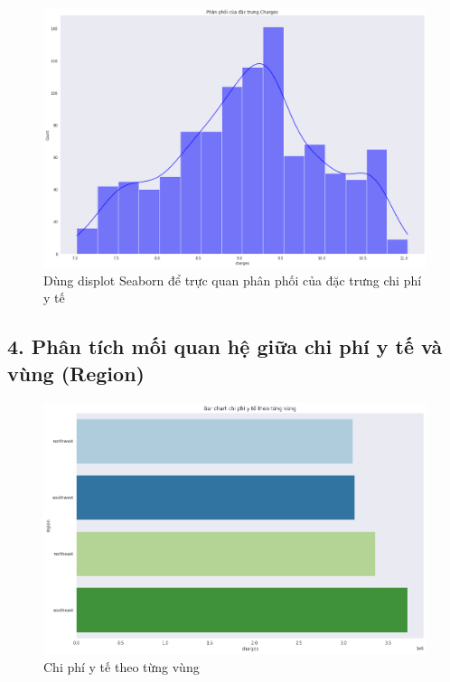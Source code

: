 \documentclass{article}
\begin{document}
	\begin{figure}[H]
		\centering
		\includegraphics[width=1\textwidth]{images/dist_medical_charges_plot_log_scale.png}
		\caption{Dùng displot Seaborn để trực quan phân phối của đặc trưng chi phí y tế}
		\label{fig:writing-thesis}
	\end{figure}
	
	\subsection{4. Phân tích mối quan hệ giữa chi phí y tế và vùng (Region)}
	\begin{figure}[H]
		\centering
		\includegraphics[width=1\textwidth]{images/bar_chart_medical_charges_region.png}
		\caption{Chi phí y tế theo từng vùng}
		\label{fig:writing-thesis}
	\end{figure}
	
\end{document}

